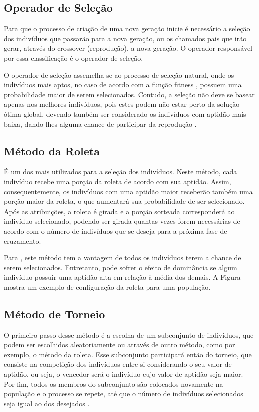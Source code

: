 \subsection{Operador de Seleção}


Para que o processo de criação de uma nova geração inicie é necessário a seleção dos indivíduos que passarão para a nova geração, ou os chamados pais que irão gerar, através do crossover (reprodução), a nova geração. O operador responsável por essa classificação é o operador de seleção.



O operador de seleção assemelha-se ao processo de seleção natural, onde os indivíduos mais aptos, no caso de acordo com a função fitness , possuem uma probabilidade maior de serem selecionados. Contudo, a seleção não deve se basear apenas nos melhores indivíduos, pois estes podem não estar perto da solução ótima global, devendo também ser considerado os indivíduos com aptidão mais baixa, dando-lhes alguma chance de participar da reprodução \cite{mognon04}.


\subsection{Método da Roleta}

É um dos mais utilizados para a seleção dos indivíduos.  Neste método, cada indivíduo recebe uma porção da roleta de acordo com sua aptidão. Assim, consequentemente, os indivíduos com uma aptidão maior receberão também uma porção maior da roleta, o que aumentará sua probabilidade de ser selecionado.  Após as atribuições,  a roleta é girada e a porção sorteada corresponderá ao indivíduo selecionado, podendo ser girada quantas vezes forem necessárias de acordo com o número de indivíduos que se deseja para a próxima fase de cruzamento.

Para \cite{mognon04}, este método tem a vantagem de todos os indivíduos terem a chance de serem selecionados.  Entretanto, pode sofrer o efeito de dominância se algum indivíduo possuir uma aptidão alta em relação à média dos demais. A Figura  mostra um exemplo de configuração da roleta para uma população.

\subsection{Método de Torneio}


O primeiro passo desse método é a escolha de um subconjunto de indivíduos, que podem ser escolhidos aleatoriamente ou através de outro método, como por exemplo, o método da roleta. Esse subconjunto participará então do torneio, que consiste na competição dos indivíduos entre si considerando o seu valor de aptidão, ou seja, o vencedor será o indivíduo cujo valor de aptidão seja maior. Por fim, todos os membros do subconjunto são colocados novamente na população e o processo se repete, até que o número de indivíduos selecionados seja igual ao dos desejados \cite{mognon04}. 

